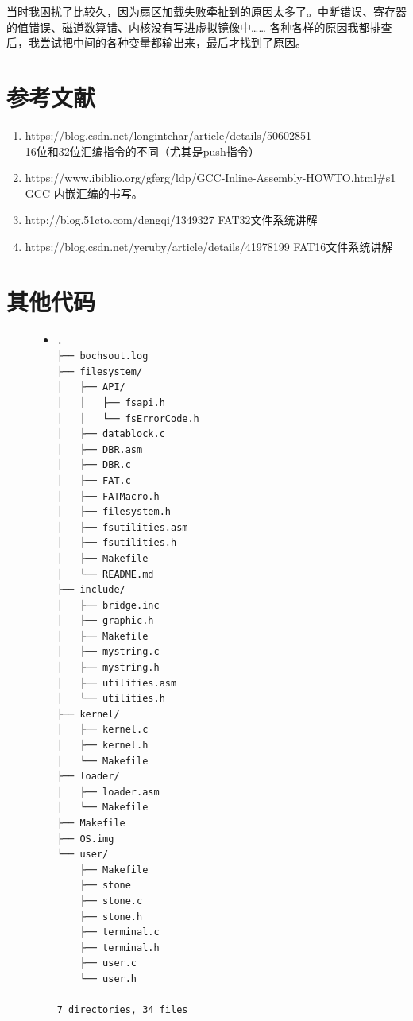 \documentclass[a4paper]{article}
\begin{document}
    当时我困扰了比较久，因为扇区加载失败牵扯到的原因太多了。中断错误、寄存器的值错误、磁道数算错、内核没有写进虚拟镜像中……
    各种各样的原因我都排查后，我尝试把中间的各种变量都输出来，最后才找到了原因。 
\begin{appendices}
\section{参考文献} \label{sec:reference}
\begin{enumerate}
    \item https://blog.csdn.net/longintchar/article/details/50602851 \\
    16位和32位汇编指令的不同（尤其是push指令）
    \item https://www.ibiblio.org/gferg/ldp/GCC-Inline-Assembly-HOWTO.html\#s1 \\
    GCC 内嵌汇编的书写。
    \item http://blog.51cto.com/dengqi/1349327
    FAT32文件系统讲解
    \item https://blog.csdn.net/yeruby/article/details/41978199
    FAT16文件系统讲解
  \end{enumerate}
\section{其他代码} \label{sec:otherCode}
\begin{figure}
\begin{itemize}
\item[] \begin{lstlisting}[label=lst:wholepjtree, caption=项目总目录树]
.
├── bochsout.log
├── filesystem/
│   ├── API/
│   │   ├── fsapi.h
│   │   └── fsErrorCode.h
│   ├── datablock.c
│   ├── DBR.asm
│   ├── DBR.c
│   ├── FAT.c
│   ├── FATMacro.h
│   ├── filesystem.h
│   ├── fsutilities.asm
│   ├── fsutilities.h
│   ├── Makefile
│   └── README.md
├── include/
│   ├── bridge.inc
│   ├── graphic.h
│   ├── Makefile
│   ├── mystring.c
│   ├── mystring.h
│   ├── utilities.asm
│   └── utilities.h
├── kernel/
│   ├── kernel.c
│   ├── kernel.h
│   └── Makefile
├── loader/
│   ├── loader.asm
│   └── Makefile
├── Makefile
├── OS.img
└── user/
    ├── Makefile
    ├── stone
    ├── stone.c
    ├── stone.h
    ├── terminal.c
    ├── terminal.h
    ├── user.c
    └── user.h

7 directories, 34 files
\end{lstlisting}
\end{itemize}
\end{figure}
\end{appendices}
\end{document}
